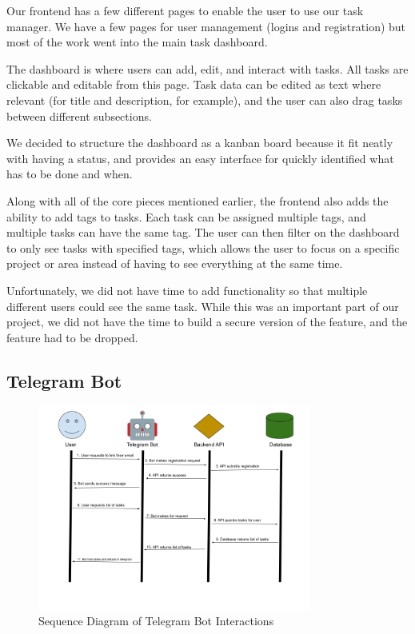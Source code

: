\documentclass[11pt,oneside]{article}
\begin{document}
Our frontend has a few different pages to enable the user to use our task manager. We have a few pages for user management (logins and registration) but most of the work went into the main task dashboard.

The dashboard is where users can add, edit, and interact with tasks. All tasks are clickable and editable from this page. Task data can be edited as text where relevant (for title and description, for example), and the user can also drag tasks between different subsections.

We decided to structure the dashboard as a kanban board because it fit neatly with having a status, and provides an easy interface for quickly identified what has to be done and when.

Along with all of the core pieces mentioned earlier, the frontend also adds the ability to add tags to tasks. Each task can be assigned multiple tags, and multiple tasks can have the same tag. The user can then filter on the dashboard to only see tasks with specified tags, which allows the user to focus on a specific project or area instead of having to see everything at the same time.

Unfortunately, we did not have time to add functionality so that multiple different users could see the same task. While this was an important part of our project, we did not have the time to build a secure version of the feature, and the feature had to be dropped.

\subsection{Telegram Bot}

\begin{figure}[H]
    \centering
    \includegraphics[width=0.8\textwidth]{telegram_bot.png}
    \caption{Sequence Diagram of Telegram Bot Interactions}
    \label{fig:telegram-diagram}
\end{figure}
\end{document}
